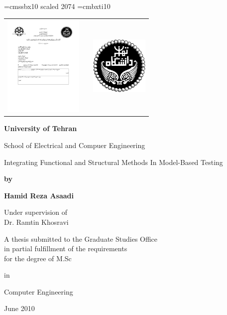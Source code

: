 \documentclass[twoside, a4paper,11pt]{book}
\numberwithin{equation}{chapter}
\numberwithin{table}{chapter}
\numberwithin{figure}{chapter}
\numberwithin{equation}{chapter}
\begin{document}
\begin{latin}
\newpage
\mbox{}


\font\titlefont=cmssbx10 scaled 2074
\font\supervisorfont=cmbxti10
\newpage
\thispagestyle{empty}
\begin{center}
\begin{tabular}{lp{7cm}r}
\includegraphics[width=3.8cm]{Figures/englogo} & & \includegraphics[width=2.8cm]{Figures/utlogo} \\
\end{tabular}

\vskip 1cm
\large\bfseries
University of Tehran \par
School of \space Electrical and Compuer Engineering
\par
\vskip 1.5cm
\addtolength{\baselineskip}{5mm}
{\titlefont Integrating Functional and Structural Methods In Model-Based Testing} \par
\addtolength{\baselineskip}{-5mm}
\vskip 1cm
{\bfseries by}\par
{\Large\bfseries Hamid Reza Asaadi}\par
\vskip 1cm
Under supervision of \\
{\supervisorfont\Large Dr. Ramtin Khosravi}
\par
\vskip 2cm
{A thesis submitted to the Graduate Studies Office \\ in partial fulfillment of the requirements \\ for the degree of M.Sc \par
in
\par
\large Computer Engineering}
\par
\vskip 1cm
{June 2010}
\par
\vfill
\end{center}

\end{latin}
\end{document}
